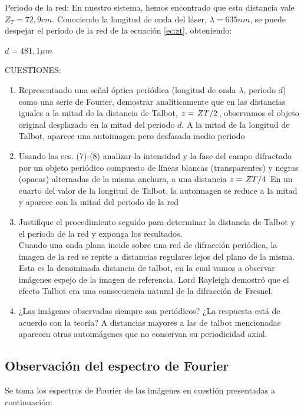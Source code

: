 \documentclass{./packages/optica-article}
\begin{document}
Periodo de la red:
En nuestro sistema, hemos encontrado que esta distancia vale $Z_T = 72,9 cm$. Conociendo la longitud de onda del láser, $\lambda = 635 nm$, se puede despejar el periodo de la red de la ecuación \ref{ec:zt}, obteniendo:
\begin{center}
    $d = 481,1 \mu m$
\end{center}


CUESTIONES:
\begin{enumerate}
\item Representando una señal óptica periódica (longitud de onda $\lambda$, periodo $d$) como una serie de Fourier, demostrar analíticamente que en las distancias iguales a la mitad de la distancia de Talbot, $z=\flatfrac{ZT}{2}$, observamos el objeto original desplazado en la mitad del periodo $d$.
A la mitad de la longitud de Talbot, aparece una autoimagen pero desfasada medio periodo
\item Usando las ecs. (7)-(8) analizar la intensidad y la fase del campo difractado por un objeto periódico compuesto de líneas blancas (transparentes) y negras (opacas) alternadas de la misma anchura, a una distancia $z=\flatfrac{ZT}{4}$
En un cuarto del valor de la longitud de Talbot, la autoimagen se reduce a la mitad y aparece con la mitad del periodo de la red
\item Justifique el procedimiento seguido para determinar la distancia de Talbot y el periodo de la red y exponga los resultados.\\
Cuando una onda plana incide sobre una red de difracción periódica, la imagen de la red se repite a distancias regulares lejos del plano de la misma. Esta es la denominada distancia de talbot, en la cual vamos a observar imágenes espejo de la imagen de referencia. Lord Rayleigh demostró que el efecto Talbot era una consecuencia natural de la difracción de Fresnel.
\item ¿Las imágenes observadas siempre son periódicos? ¿La respuesta está de acuerdo con la teoría?
A distancias mayores a las de talbot mencionadas aparecen otras autoimágenes que no conservan su periodicidad axial.
\end{enumerate}

\subsection{Observación del espectro de Fourier}
Se toma los espectros de Fourier de las imágenes en cuestión presentadas a continuación:
\end{document}
